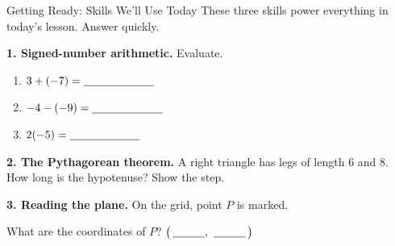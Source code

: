 \documentclass[10pt]{article}
\begin{document}

\vspace{0.12in}

\begin{notesbox}{Getting Ready: Skills We'll Use Today}
\small These three skills power everything in today's lesson. Answer quickly.

\vspace{4pt}
\textbf{1. Signed-number arithmetic.} Evaluate.
\begin{enumerate}[label=(\alph*), leftmargin=2.0em, itemsep=6pt]
  \item $3 + (-7) = \blank{2.2cm}$
  \item $-4 - (-9) = \blank{2.2cm}$
  \item $2(-5) = \blank{2.2cm}$
\end{enumerate}

\vspace{6pt}
\textbf{2. The Pythagorean theorem.} A right triangle has legs of length $6$ and $8$.
How long is the hypotenuse? Show the step.

\vspace{4pt}
\textbf{3. Reading the plane.} On the grid, point $P$ is marked.
\begin{center}
\end{center}
What are the coordinates of $P$? \; $\big(\,\blank{1.0cm},\ \blank{1.0cm}\,\big)$
\end{notesbox}
\end{document}
